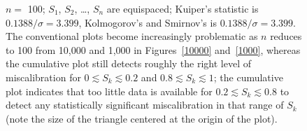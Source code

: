 \documentclass{article}
\begin{document}
\begin{figure}
\begin{centering}
\end{centering}
\caption{$n =$ 100; $S_1$, $S_2$, \dots, $S_n$ are equispaced;
         Kuiper's statistic is $0.1388 / \sigma = 3.399$,
         Kolmogorov's and Smirnov's is $0.1388 / \sigma = 3.399$.
The conventional plots become increasingly problematic as $n$ reduces to 100
from 10,000 and 1,000 in Figures~\ref{10000} and~\ref{1000},
whereas the cumulative plot still detects roughly the right level
of miscalibration for $0 \lesssim S_k \lesssim 0.2$
and $0.8 \lesssim S_k \lesssim 1$; the cumulative plot
indicates that too little data is available for $0.2 \lesssim S_k \lesssim 0.8$
to detect any statistically significant miscalibration in that range of $S_k$
(note the size of the triangle centered at the origin of the plot).
}
\label{100}
\end{figure}
\end{document}
